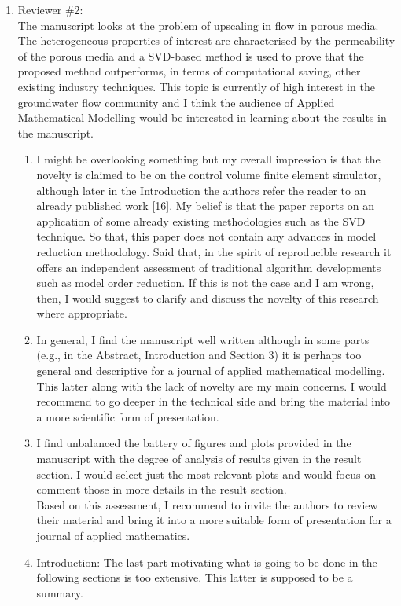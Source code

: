 \documentclass[11pt]{letter} %
\begin{document}
\begin{letter}
{\begin{enumerate}
\item Reviewer \#2: \\
  The manuscript looks at the problem of upscaling in flow in porous media. The heterogeneous properties of interest are characterised by the permeability of the porous media and a SVD-based method is used to prove that the proposed method outperforms, in terms of computational saving, other existing industry techniques. This topic is currently of high interest in the groundwater flow community and I think the audience of Applied Mathematical Modelling would be interested in learning about the results in the manuscript.\\
  \begin{enumerate}
    \item I might be overlooking something but my overall impression is that the novelty is claimed to be on the control volume finite element simulator, although later in the Introduction the authors refer the reader to an already published work [16]. My belief is that the paper reports on an application of some already existing methodologies such as the SVD technique. So that, this paper does not contain any advances in model reduction methodology. Said that, in the spirit of reproducible research it offers an independent assessment of traditional algorithm developments such as model order reduction. If this is not the case and I am wrong, then, I would suggest to clarify and discuss the novelty of this research where appropriate.\\
    \item In general, I find the manuscript well written although in some parts (e.g., in the Abstract, Introduction and Section 3) it is perhaps too general and descriptive for a journal of applied mathematical modelling. This latter along with the lack of novelty are my main concerns. I would recommend to go deeper in the technical side and bring the material into a more scientific form of presentation.
      \item I find unbalanced the battery of figures and plots provided in the manuscript with the degree of analysis of results given in the result section. I would select just the most relevant plots and would focus on comment those in more details in the result section.\\
Based on this assessment, I recommend to invite the authors to review their material and bring it into a more suitable form of presentation for a journal of applied mathematics.\\
\item Introduction: The last part motivating what is going to be done in the following sections is too extensive. This latter is supposed to be a summary.\\

\end{enumerate}
\end{enumerate}}
\end{letter}
\end{document}
